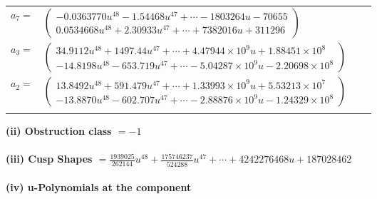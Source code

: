 \documentclass[1p]{elsarticle_modified}
\theoremstyle{definition}
\begin{document}
\begin{tabular}{m{7pt} m{180pt} m{7pt} m{180pt} }
\flushright $a_{7}=$&$\begin{pmatrix}-0.0363770 u^{48}-1.54468 u^{47}+\cdots-1803264 u-70655\\0.0534668 u^{48}+2.30933 u^{47}+\cdots+7382016 u+311296\end{pmatrix}$ \\
\flushright $a_{3}=$&$\begin{pmatrix}34.9112 u^{48}+1497.44 u^{47}+\cdots+4.47944\times10^{9} u+1.88451\times10^{8}\\-14.8198 u^{48}-653.719 u^{47}+\cdots-5.04287\times10^{9} u-2.20698\times10^{8}\end{pmatrix}$ \\
\flushright $a_{2}=$&$\begin{pmatrix}13.8492 u^{48}+591.479 u^{47}+\cdots+1.33993\times10^{9} u+5.53213\times10^{7}\\-13.8870 u^{48}-602.707 u^{47}+\cdots-2.88876\times10^{9} u-1.24329\times10^{8}\end{pmatrix}$\\&\end{tabular}
\flushleft \textbf{(ii) Obstruction class $= -1$}\\~\\
\flushleft \textbf{(iii) Cusp Shapes $= \frac{1939025}{262144} u^{48}+\frac{175746237}{524288} u^{47}+\cdots+4242276468 u+187028462$}\\~\\
\newpage\renewcommand{\arraystretch}{1}
\flushleft \textbf{(iv) u-Polynomials at the component}\newline \\
\end{document}
